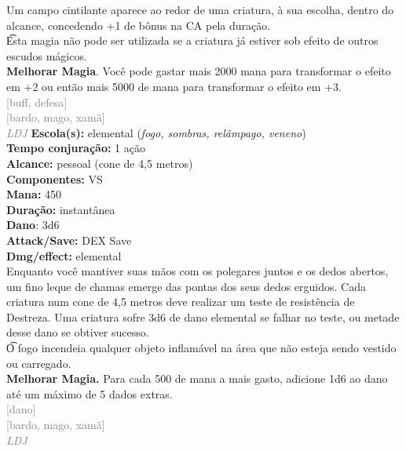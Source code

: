 \documentclass{RPG_Adventure}[2021/10/20]
\begin{document}
{\normalsize Um campo cintilante aparece ao redor de uma criatura, à sua escolha, dentro do alcance, concedendo +1 de bônus na CA pela duração.\\\t Esta magia não pode ser utilizada se a criatura já estiver sob efeito de outros escudos mágicos.\\\t \textbf{Melhorar Magia}. Você pode gastar mais 2000 mana para transformar o efeito em +2 ou então mais 5000 de mana para transformar o efeito em +3.\\}
{\scriptsize \textcolor{gray}{[buff, defesa]\\}}
{\scriptsize \textcolor{gray}{[bardo, mago, xamã]\\}}
{\tiny \textcolor{gray}{\textit{LDJ}}}\jump{}
{\small \t \textbf{Escola(s):} elemental (\textit{fogo, sombras, relâmpago, veneno})\\\t \textbf{Tempo conjuração:} 1 ação\\\t \textbf{Alcance:} pessoal (cone de 4,5 metros)\\\t \textbf{Componentes:} VS\\\t \textbf{Mana:} 450\\\t \textbf{Duração:} instantânea\\\t \textbf{Dano}: 3d6\\\t \textbf{Attack/Save:} DEX Save\\\t \textbf{Dmg/effect:} elemental\\}
{\normalsize Enquanto você mantiver suas mãos com os polegares juntos e os dedos abertos, um fino leque de chamas emerge das pontas dos seus dedos erguidos. Cada criatura num cone de 4,5 metros deve realizar um teste de resistência de Destreza. Uma criatura sofre 3d6 de dano elemental se falhar no teste, ou metade desse dano se obtiver sucesso.\\\t O fogo incendeia qualquer objeto inflamável na área que não esteja sendo vestido ou carregado.\\\t \textbf{Melhorar Magia.} Para cada 500 de mana a mais gasto, adicione 1d6 ao dano até um máximo de 5 dados extras.\\}
{\scriptsize \textcolor{gray}{[dano]\\}}
{\scriptsize \textcolor{gray}{[bardo, mago, xamã]\\}}
{\tiny \textcolor{gray}{\textit{LDJ}}}\jump{}
\end{document}
